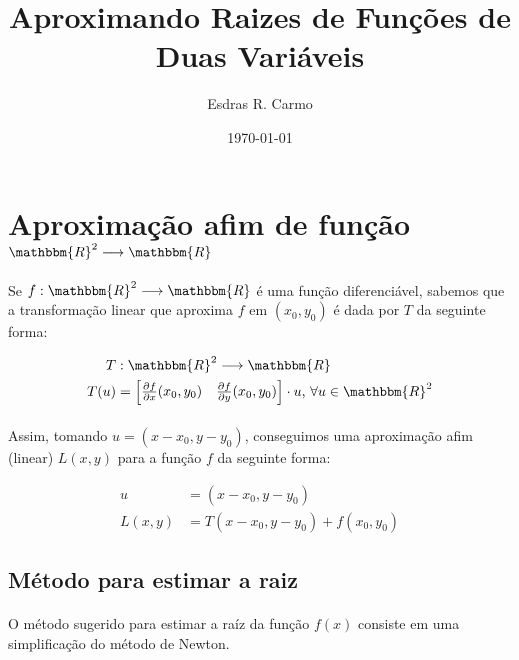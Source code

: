 \documentclass{article}
\author{Esdras R. Carmo}
\title{Aproximando Raizes de Funções de Duas Variáveis}
\date{\today}
\begin{document}
    \maketitle

    \section{Aproximação afim de função $\mathbbm{R}^2 \longrightarrow \mathbbm{R}$}
        \paragraph{}
        Se $f: \mathbbm{R}^2 \longrightarrow \mathbbm{R}$ é uma função diferenciável, sabemos que a transformação
        linear que aproxima $f$ em $(x_0, y_0)$ é dada por $T$ da seguinte forma:

        \begin{align*}
            T&: \mathbbm{R}^2 \longrightarrow \mathbbm{R}\\
            T(u) &= \left[\begin{matrix} \frac{\partial f}{\partial x} (x_0, y_0)&
                                         \frac{\partial f}{\partial y} (x_0, y_0)\end{matrix}\right] \cdot u \text{,  } \forall u \in \mathbbm{R}^2
        \end{align*}

        \paragraph{}
        Assim, tomando $u = (x - x_0, y - y_0)$, conseguimos uma aproximação afim (linear) $L(x, y)$ para a função $f$ da seguinte forma:

        \begin{align*}
            u &= (x - x_0, y - y_0)\\
            L(x, y) &= T(x - x_0, y - y_0) + f(x_0, y_0)
        \end{align*}

        \subsection{Método para estimar a raiz}
            \paragraph{}
            O método sugerido para estimar a raíz da função $f(x)$ consiste em uma simplificação
            do método de Newton.
\end{document}
